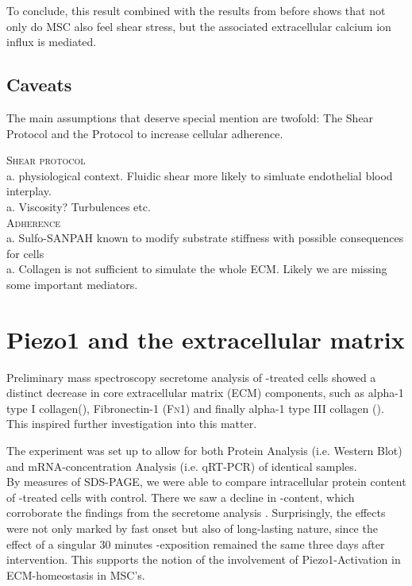 To conclude, this result combined with the results from before shows that not only do MSC also feel shear stress, but the associated extracellular calcium ion influx is \Piezo mediated. 

\subsection{Caveats}
The main assumptions that deserve special mention are twofold: The Shear Protocol and the Protocol to increase cellular adherence. \par

\textsc{Shear protocol}\\
a. physiological context. Fluidic shear more likely to simluate endothelial blood interplay.\\
a. Viscosity? Turbulences etc.\\
\textsc{Adherence}\\
a. Sulfo-SANPAH known to modify substrate stiffness with possible consequences for cells\\
a. Collagen is not sufficient to simulate the whole ECM. Likely we are missing some important mediators.

\section{Piezo1 and the extracellular matrix}

Preliminary mass spectroscopy secretome analysis of \Yoda-treated cells showed a distinct decrease in core extracellular matrix (ECM) components, such as alpha-1 type I collagen(\colone), Fibronectin-1 (\textsc{Fn1}) and finally alpha-1 type III collagen (\colthree).
This inspired further investigation into this matter.\par

The experiment was set up to allow for both Protein Analysis (i.e. Western Blot) and mRNA-concentration Analysis (i.e. qRT-PCR) of identical samples.\\
By measures of SDS-PAGE, we were able to compare intracellular protein content of \Yoda-treated cells with control. There we saw a  decline in \colone-content, which corroborate the findings from the secretome analysis . Surprisingly, the effects were not only marked by fast onset but also of long-lasting nature, since the effect of a singular 30 minutes \Yoda-exposition remained the same three days after intervention. This supports the notion of the involvement of Piezo1-Activation in ECM-homeostasis in MSC's. \par

